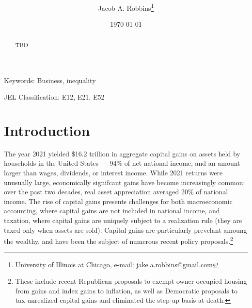 \documentclass[12pt]{article}
\begin{document}
\title{ }
%
\author {Jacob A. Robbins\footnote{\baselineskip=11pt University of Illinois at Chicago, e-mail: jake.a.robbins@gmail.com}  }

\date{\today}
 \maketitle
\thispagestyle{empty}
 

 \begin{abstract}  
TBD


\end{abstract}

\vspace{50pt}
Keywords: Business, inequality

\vspace{0pt}
JEL Classification: E12, E21, E52
\vspace{10pt}

\pagebreak
\addtocounter{page}{-1}

\newpage
 
 \thispagestyle{fancy}
 
  
 \section{Introduction}

The year 2021 yielded \$16.2 trillion in aggregate capital gains on assets held by households in the United States — 94\% of net national income, and an amount larger than wages, dividends, or interest income. While 2021 returns were unusually large, economically signifcant gains have become increasingly common: over the past two decades, real asset appreciation averaged 20\% of national income. The rise of capital gains presents challenges for both  macroeconomic accounting, where capital gains are not included in national income, and taxation, where capital gains are uniquely subject to a realization rule (they are taxed only when assets are sold). Capital gains are particularly prevelant amoung the wealthy, and have been the subject of numerous recent policy proposals.\footnote{These include recent Republican proposals to exempt owner-occupied housing from gains and index gains to inflation, as well as Democratic proposals to tax unrealized capital gains and eliminated the step-up basis at death.}
\end{document}
